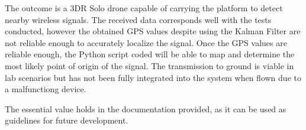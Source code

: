 The outcome is a 3DR Solo drone capable of carrying the platform to detect nearby wireless signals. The received data corresponds well with the tests conducted, however the obtained GPS values despite using the Kalman Filter are not reliable enough to accurately localize the signal. Once the GPS values are reliable enough, the Python script coded will be able to map and determine the most likely point of origin of the signal. The transmission to ground is viable in lab scenarios but has not been fully integrated into the system when flown due to a malfunctiong device. \par

The essential value holds in the documentation provided, as it can be used as guidelines for future development.